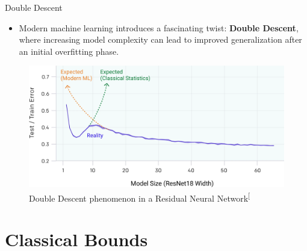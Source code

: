 \documentclass[
  ignorenonframetext,
]{beamer}
\providecommand{\tightlist}{%
  \setlength{\itemsep}{0pt}\setlength{\parskip}{0pt}}\usepackage{longtable,booktabs,array}
\begin{document}
\begin{frame}{Double Descent}
\label{double-descent}
\begin{itemize}
\tightlist
\item
  Modern machine learning introduces a fascinating twist: \textbf{Double
  Descent}, where increasing model complexity can lead to improved
  generalization after an initial overfitting phase.
\end{itemize}

\begin{figure}[H]

{\centering \includegraphics[width=0.83\linewidth,height=\textheight,keepaspectratio]{extra/double_descent.png}

}

\caption{Double Descent phenomenon in a Residual Neural
Network\textsuperscript{{[}\citeproc{ref-nakkiran19}{2}{]}}}

\end{figure}%
\end{frame}

\section{Classical Bounds}\label{classical-bounds}
\end{document}
